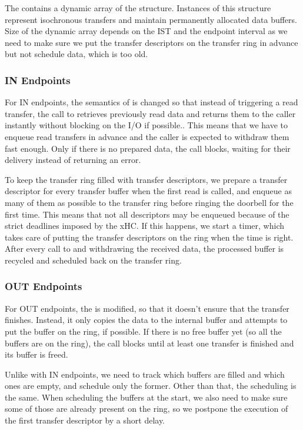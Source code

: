 The  contains a dynamic array of the
 structure. Instances of this structure represent isochronous transfers and
maintain permanently allocated data buffers. Size of the dynamic array depends on
the IST and the endpoint interval as we need to make sure we put the transfer
descriptors on the transfer ring in advance but not schedule data, which is too old.

\subsubsection{IN Endpoints}

For IN endpoints, the semantics of  is changed so that instead
of triggering a read transfer, the call to  retrieves previously read data and
returns them to the caller instantly without blocking on the I/O if possible.. This means that we have to enqueue read transfers
in advance and the caller is expected to withdraw them fast enough. Only if there is
no prepared data, the call blocks, waiting for their delivery instead of returning an
error.

To keep the transfer ring filled with transfer descriptors, we prepare a
transfer descriptor for every transfer buffer when the first read is called, and
enqueue as many of them as possible to the transfer ring before ringing the doorbell
for the first time. This means that not all descriptors may be enqueued because
of the strict deadlines imposed by the xHC. If this happens, we start a timer,
which takes care of putting the transfer descriptors on the ring when the time
is right. After every call to  and withdrawing the received data,
the processed buffer is recycled and scheduled back on the transfer ring.

\subsubsection{OUT Endpoints}

For OUT endpoints, the  is modified, so that it doesn't ensure that the transfer
finishes. Instead, it only copies the data to the internal buffer and attempts to put
the buffer on the ring, if possible. If there is no free buffer yet (so all the
buffers are on the ring), the call blocks until at least one transfer is
finished and its buffer is freed.

Unlike with IN endpoints, we need to track which buffers are filled and which ones
are empty, and schedule only the former. Other than that, the scheduling is
the same. When scheduling the buffers at the start, we also need to make sure
some of those are already present on the ring, so we postpone the execution of
the first transfer descriptor by a short delay.

